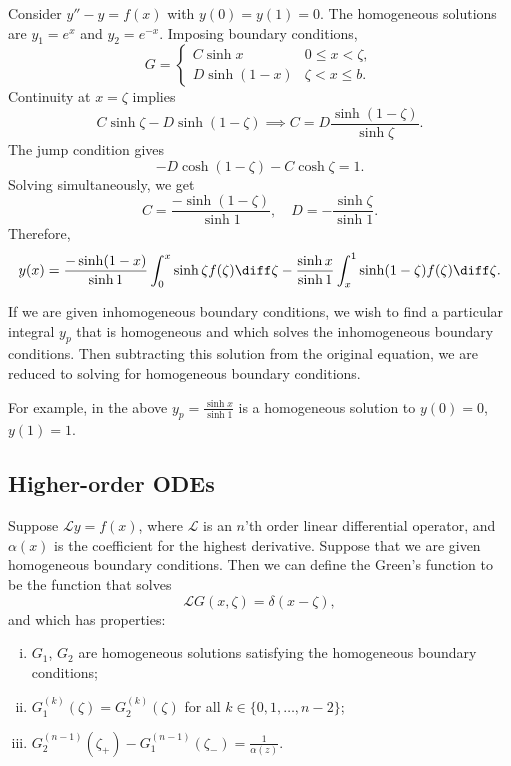 \documentclass[12pt]{article}
\begin{document}
\begin{exbox}
	Consider $y'' - y = f(x)$ with $y(0) = y(1) = 0$. The homogeneous solutions are $y_1 = e^{x}$ and $y_2 = e^{-x}$. Imposing boundary conditions,
	\[
	G =
	\begin{cases}
		C \sinh x & 0 \leq x < \zeta, \\
		D \sinh (1 - x) & \zeta < x \leq b.
	\end{cases}
	\]
	Continuity at $x = \zeta$ implies
	\[
		C \sinh \zeta - D \sinh (1 - \zeta) \implies C = D \frac{\sinh (1 - \zeta)}{\sinh \zeta}
	.\]
	The jump condition gives
	\[
		-D \cosh (1 - \zeta) - C \cosh \zeta = 1
	.\]
	Solving simultaneously, we get
	\[
		C = \frac{- \sinh(1 - \zeta)}{\sinh 1}, \quad D = - \frac{\sinh \zeta}{\sinh 1}
	.\]
	Therefore,
	\[
		y(x) = \frac{-\sinh(1 - x)}{\sinh 1} \int_{0}^{x} \sinh \zeta f(\zeta) \diff \zeta - \frac{\sinh x}{\sinh 1} \int_{x}^{1} \sinh (1 - \zeta)f(\zeta) \diff \zeta
	.\]
\end{exbox}

If we are given inhomogeneous boundary conditions, we wish to find a particular integral $y_p$ that is homogeneous and which solves the inhomogeneous boundary conditions. Then subtracting this solution from the original equation, we are reduced to solving for homogeneous boundary conditions.

For example, in the above $y_p=  \frac{\sinh x}{\sinh 1}$ is a homogeneous solution to $y(0) = 0$, $y(1) = 1$.

\subsection{Higher-order ODEs}%
\label{sub:higher_order_odes}

Suppose $\mathcal{L}y = f(x)$, where $\mathcal{L}$ is an $n$'th order linear differential operator, and $\alpha(x)$ is the coefficient for the highest derivative. Suppose that we are given homogeneous boundary conditions. Then we can define the Green's function to be the function that solves
\[
	\mathcal{L}G(x, \zeta) = \delta(x - \zeta)
,\]
and which has properties:
\begin{enumerate}[(i)]
	\item $G_1$, $G_2$ are homogeneous solutions satisfying the homogeneous boundary conditions;
	\item $G_1^{(k)}(\zeta) = G_2^{(k)}(\zeta)$ for all $k \in \{0, 1, \ldots, n-2\}$;
	\item $G_2^{(n-1)}(\zeta_{+}) - G_1^{(n-1)}(\zeta_{-}) = \frac{1}{\alpha(z)}$.
\end{enumerate}
\end{document}
